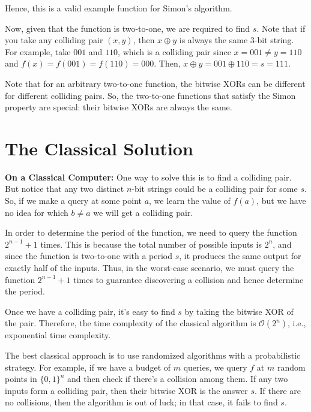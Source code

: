 \begin{example}
    Hence, this is a valid example function for Simon's algorithm.

    Now, given that the function is two-to-one, we are required to find $s$. Note that if you take any colliding pair $(x, y)$, then $x \oplus y$ is always the same 3-bit string. For example, take $001$ and $110$, which is a colliding pair since $x = 001 \neq y = 110$ and $f(x) = f(001) = f(110) = 000$. Then, $x \oplus y = 001 \oplus 110 = s = 111$.

    Note that for an arbitrary two-to-one function, the bitwise XORs can be different for different colliding pairs. So, the two-to-one functions that satisfy the Simon property are special: their bitwise XORs are always the same.
\end{example}


\section{The Classical Solution}

\textbf{On a Classical Computer:} One way to solve this is to find a colliding pair. But notice that any two distinct $n$-bit strings could be a colliding pair for some $s$. So, if we make a query at some point $a$, we learn the value of $f(a)$, but we have no idea for which $b \neq a$ we will get a colliding pair.

In order to determine the period of the function, we need to query the function $2^{n-1} + 1$ times. This is because the total number of possible inputs is $2^n$, and since the function is two-to-one with a period $s$, it produces the same output for exactly half of the inputs. Thus, in the worst-case scenario, we must query the function $2^{n-1} + 1$ times to guarantee discovering a collision and hence determine the period.

Once we have a colliding pair, it's easy to find $s$ by taking the bitwise XOR of the pair. Therefore, the time complexity of the classical algorithm is $\mathcal{O}(2^n)$, i.e., exponential time complexity.

The best classical approach is to use randomized algorithms with a probabilistic strategy. For example, if we have a budget of $m$ queries, we query $f$ at $m$ random points in $\{0,1\}^n$ and then check if there's a collision among them. If any two inputs form a colliding pair, then their bitwise XOR is the answer $s$. If there are no collisions, then the algorithm is out of luck; in that case, it fails to find $s$.

